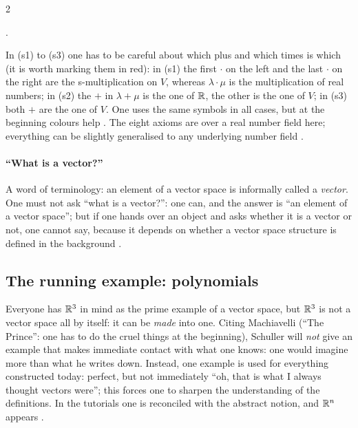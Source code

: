 \begin{paracol}{2}
\begin{definition}
.
\end{definition}
In (s1) to (s3) one has to be careful about which plus and which times is which (it is worth marking them in red): in (s1) the first $\cdot$ on the left and the last $\cdot$ on the right are the s-multiplication on $V$, whereas $\lambda\cdot\mu$ is the multiplication of
real numbers; in (s2) the $+$ in $\lambda+\mu$ is the one of $\mathbb{R}$, the other is the one of $V$; in (s3) both $+$ are the one of $V$. One uses the same symbols in all cases, but at the beginning colours help
. The eight axioms are over a real number field here; everything can be slightly generalised to any underlying number field
.

\paragraph{``What is a vector?''} A word of terminology: an element of a vector space is informally called a \emph{vector}. One must not ask ``what is a vector?'': one can, and the answer is ``an element of a vector space'';
but if one hands over an object and asks whether it is a vector or not, one cannot say, because it depends on whether a vector space structure is defined in the background .

\subsection{The running example: polynomials}

Everyone has $\mathbb{R}^3$ in mind as the prime example of a vector space, but $\mathbb{R}^3$ is not a vector space all by itself: it can be \emph{made} into one. Citing Machiavelli (``The Prince'': one has to do the cruel things at the beginning),
Schuller will \emph{not} give an example that makes immediate contact with what one knows: one would imagine more than what he writes down. Instead, one example is used for everything constructed today: perfect, but not immediately
``oh, that is what I always thought vectors were''; this forces one to sharpen the understanding of the definitions. In the tutorials one is reconciled with the abstract notion, and $\mathbb{R}^n$ appears
.


\end{paracol}
